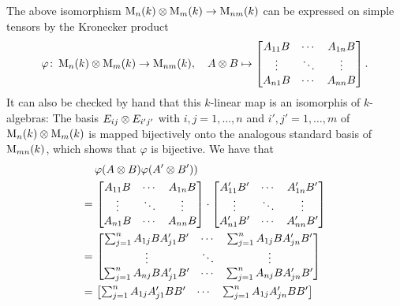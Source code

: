 \begin{remark}
  The above isomorphism $\operatorname{M}_n(k) \mathbin{\otimes} \operatorname{M}_m(k) \to \operatorname{M}_{nm}(k)$ can be expressed on simple tensors by the Kronecker product
  \[
            \varphi
    \colon  \operatorname{M}_n(k) \mathbin{\otimes} \operatorname{M}_m(k)
    \to     \operatorname{M}_{nm}(k),
    \quad   A \mathbin{\otimes} B
    \mapsto \begin{bmatrix}
              A_{11} B  & \cdots  & A_{1n} B  \\
              \vdots    & \ddots  & \vdots    \\
              A_{n1} B  & \cdots  & A_{nn} B
            \end{bmatrix}.
  \]
  It can also be checked by hand that this $k$-linear map is an isomorphis of $k$-algebras:
  The basis $E_{ij} \mathbin{\otimes} E_{i'j'}$ with $i,j = 1, \dotsc, n$ and $i', j' = 1, \dotsc, m$ of $\operatorname{M}_n(k) \mathbin{\otimes} \operatorname{M}_m(k)$ is mapped bijectively onto the analogous standard basis of $\operatorname{M}_{mn}(k)$, which shows that $\varphi$ is bijective.
  We have that
  \begingroup
  \allowdisplaybreaks
  \begin{align*}
      &\,  \varphi(A \mathbin{\otimes} B) \varphi(A' \mathbin{\otimes} B'))
    \\
    =&\,  \begin{bmatrix}
            A_{11} B  & \cdots  & A_{1n} B  \\
            \vdots    & \ddots  & \vdots    \\
            A_{n1} B  & \cdots  & A_{nn} B
          \end{bmatrix}
          \cdot
          \begin{bmatrix}
            A'_{11} B'  & \cdots  & A'_{1n} B'  \\
            \vdots      & \ddots  & \vdots      \\
            A'_{n1} B'  & \cdots  & A'_{nn} B'
          \end{bmatrix}
    \\
    =&\,  \begin{bmatrix}
            \sum_{j=1}^n A_{1j} B A'_{j1} B'  & \cdots  & \sum_{j=1}^n A_{1j} B A'_{jn} B'  \\
            \vdots                            & \ddots  & \vdots                            \\
            \sum_{j=1}^n A_{nj} B A'_{j1} B'  & \cdots  & \sum_{j=1}^n A_{nj} B A'_{jn} B'
          \end{bmatrix}
    \\
    =&\,  \begin{bmatrix}
            \sum_{j=1}^n A_{1j} A'_{j1} B B'  & \cdots  & \sum_{j=1}^n A_{1j} A'_{jn} B B'  \\

\end{bmatrix}
\end{align*}
\end{remark}
